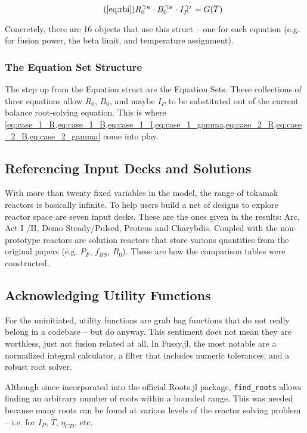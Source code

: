 \begin{equation}
	\tag{\ref{eq:rbi}}
	R_0^{\, \gamma_R} \cdot B_0^{\, \gamma_B} \cdot I_P^{\, \gamma_I} = G( \overline T )
\end{equation}

Concretely, there are 16 objects that use this struct -- one for each equation (e.g. for fusion power, the beta limit, and temperature assignment).

\subsubsection{The Equation Set Structure}

The step up from the Equation struct are the Equation Sets. These collections of three equations allow $R_0$, $B_0$, and maybe $I_P$ to be substituted out of the current balance root-solving equation. This is where \cref{eq:case_1_R,eq:case_1_B,eq:case_1_I,eq:case_1_gamma,eq:case_2_R,eq:case_2_B,eq:case_2_gamma} come into play.

\subsection{Referencing Input Decks and Solutions}

With more than twenty fixed variables in the model, the range of tokamak reactors is basically infinite. To help users build a net of designs to explore reactor space are seven input decks. These are the ones given in the results: Arc, Act I /II, Demo Steady/Pulsed, Proteus and Charybdis. Coupled with the non-prototype reactors are solution reactors that store various quantities from the original papers (e.g. $P_F$, $f_{BS}$, $R_0$). These are how the comparison tables were constructed.

\subsection{Acknowledging Utility Functions}

For the uninitiated, utility functions are grab bag functions that do not really belong in a codebase -- but do anyway. This sentiment does not mean they are worthless, just not fusion related at all. In Fussy.jl, the most notable are a normalized integral calculator, a filter that includes numeric tolerances, and a robust root solver. 

Although since incorporated into the official Roots.jl package, \texttt{find\_roots} allows finding an arbitrary number of roots within a bounded range. This was needed because many roots can be found at various levels of the reactor solving problem -- i.e. for $I_P$, $\overline T$, $\eta_{CD}$, etc.

